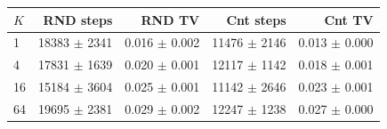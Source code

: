 \begin{tabular}{lrrrr}
\hline
$K$ & RND steps & RND TV & Cnt steps & Cnt TV \\
\hline
1 & 18383 $\pm$ 2341 & 0.016 $\pm$ 0.002 & 11476 $\pm$ 2146 & 0.013 $\pm$ 0.000 \\
4 & 17831 $\pm$ 1639 & 0.020 $\pm$ 0.001 & 12117 $\pm$ 1142 & 0.018 $\pm$ 0.001 \\
16 & 15184 $\pm$ 3604 & 0.025 $\pm$ 0.001 & 11142 $\pm$ 2646 & 0.023 $\pm$ 0.001 \\
64 & 19695 $\pm$ 2381 & 0.029 $\pm$ 0.002 & 12247 $\pm$ 1238 & 0.027 $\pm$ 0.000 \\
\hline
\end{tabular}
